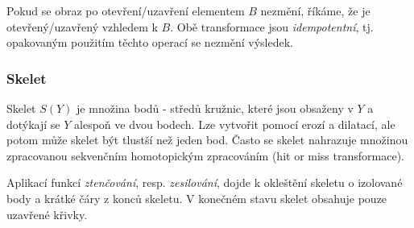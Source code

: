 Pokud se obraz po otevření/uzavření elementem $ B $ nezmění, říkáme, že je otevřený/uzavřený vzhledem k $ B $. Obě transformace jsou \textit{idempotentní}, tj. opakovaným použitím těchto operací se nezmění výsledek.

\subsubsection*{Skelet}
Skelet $ S(Y) $ je množina bodů - středů kružnic, které jsou obsaženy v $ Y $ a dotýkají se $ Y $ alespoň ve dvou bodech. Lze vytvořit pomocí erozí a dilatací, ale potom může skelet být tlustší než jeden bod. Často se skelet nahrazuje množinou zpracovanou sekvenčním homotopickým zpracováním (hit or miss transformace).

Aplikací funkcí \textit{ztenčování}, resp. \textit{zesilování}, dojde k okleštění skeletu o izolované body a krátké čáry z konců skeletu. V konečném stavu skelet obsahuje pouze uzavřené křivky.